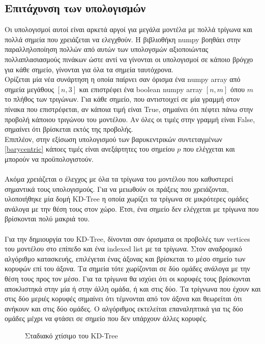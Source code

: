 \documentclass{report}
\begin{document}
\subsection{Επιτάχυνση των υπολογισμών} \label{sec:kdtree}
Οι υπολογισμοί αυτοί είναι αρκετά αργοί για μεγάλα μοντέλα με πολλά τρίγωνα και πολλά σημεία που χρειάζεται να ελεγχθούν.
Η βιβλιοθήκη numpy βοηθάει στην παραλληλοποίηση πολλών από αυτών των υπολογσμών αξιοποιώντας πολλαπλασιασμούς πινάκων ώστε
αντί να γίνονται οι υπολογισμοί σε κάποιο βρόγχο για κάθε σημείο, γίνονται για όλα τα σημεία ταυτόχρονα.\\
Ορίζεται μία νέα συνάρτηση η οποία παίρνει σαν όρισμα ένα numpy array από σημεία μεγάθους $\left[n, 3\right]$ και επιστρέφει
ένα boolean numpy array $\left[n, m\right]$ όπου $m$ το πλήθος των τριγώνων. Για κάθε σημείο, που αντιστοιχεί σε μία γραμμή στον πίνακα
που επιστρέφεται, αν κάποια τιμή είναι True, σημαίνει ότι πέφτει πάνω στην προβολή κάποιου τριγώνου του μοντέλου. Αν όλες οι τιμές στην γραμμή
είναι False, σημαίνει ότι βρίσκεται εκτός της προβολής.
\\
Επιπλέον, στην εξίσωση υπολογισμού των βαρυκεντρικών συντεταγμένων \eqref{barycentric} κάποες τιμές είναι ανεξάρτητες
του σημείου $p$ που ελέγχεται και μπορούν να προϋπολογιστούν.
\\\\
Ακόμα χρειάζεται ο έλεγχος με όλα τα τρίγωνα του μοντέλου που καθυστερεί σημαντικά τους υπολογισμούς. Για να μειωθούν οι πράξεις που
χρειάζονται, υλοποιήθηκε μία δομή KD-Tree η οποία χωρίζει τα τρίγωνα σε μικρότερες ομάδες ανάλογα με την θέση τους στον χώρο. Έτσι, ένα
σημείο δεν ελέγχεται με τρίγωνα που βρίσκονται πολύ μακριά του.
\\\\
Για την δημιουργία του KD-Tree, δίνονται σαν όρισματα οι προβολές των vertices του μοντέλου στο επίπεδο και ένα indexed list
με τα τρίγωνα. Στον αναδρομικό αλγόριθμο κατασκευής, επιλέγεται ένας άξονας και βρίσκεται το μέσο σημείο των κορυφών επί του άξονα.
Τα σημεία τότε χωρίζονται σε δύο ομάδες ανάλογα με την θέση τους προς τον μέσο. Για τα τρίγωνα θα ισχύει ότι οι κορυφές τους βρίσκονται
αποκλιστηκά στην μία ή στην άλλη ομάδα, ή και στις δύο. Τα τρίγνωνα που έχουν και στις δύο μεριές κορυφές σημαίνει ότι τέμνονται
από τον άξονα και θεωρείται ότι ανήκουν και στις δύο ομάδες. Ο αλγόριθμος εκτελείται επαναληπτικά για τις δύο ομάδες μέχρι να
φτάσει σε σημείο που δεν υπάρχουν άλλες κορυφές.

\begin{figure}[H] 
    \centering
    \captionsetup{font=small}
    \captionsetup{font=normal}
    \caption{Σταδιακό χτίσιμο του KD-Tree}
\end{figure}
\end{document}
